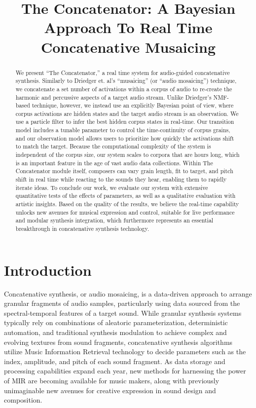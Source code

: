 \documentclass{article}
\title{The Concatenator: A Bayesian Approach To Real Time Concatenative Musaicing}
\begin{document}
%
\maketitle
%

\begin{abstract}
    We present ``The Concatenator,'' a real time system for audio-guided concatenative synthesis. Similarly to Driedger et. al's ``musaicing'' (or ``audio mosaicing'') technique, we concatenate a set number of activations within a corpus of audio to re-create the harmonic and percussive aspects of a target audio stream. Unlike Driedger's NMF-based technique, however, we instead use an explicitly Bayesian point of view, where corpus activations are hidden states and the target audio stream is an observation. We use a particle filter to infer the best hidden corpus states in real-time. Our transition model includes a tunable parameter to control the time-continuity of corpus grains, and our observation model allows users to prioritize how quickly the activations shift to match the target. Because the computational complexity of the system is independent of the corpus size, our system scales to corpora that are hours long, which is an important feature in the age of vast audio data collections. Within The Concatenator module itself, composers can vary grain length, fit to target, and pitch shift in real time while reacting to the sounds they hear, enabling them to rapidly iterate ideas. To conclude our work, we evaluate our system with extensive quantitative tests of the effects of parameters, as well as a qualitative evaluation with artistic insights. Based on the quality of the results, we believe the real-time capability unlocks new avenues for musical expression and control, suitable for live performance and modular synthesis integration, which furthermore represents an essential breakthrough in concatenative synthesis technology.
    
\end{abstract}

\section{Introduction}

Concatenative synthesis, or audio mosaicing, is a data-driven approach to arrange granular fragments of audio samples, particularly using data sourced from the spectral-temporal features of a target sound. While granular synthesis systems typically rely on combinations of aleatoric parameterization, deterministic automation, and traditional synthesis modulation to achieve complex and evolving textures from sound fragments, concatenative synthesis algorithms utilize Music Information Retrieval technology to decide parameters such as the index, amplitude, and pitch of each sound fragment. As data storage and processing capabilities expand each year, new methods for harnessing the power of MIR are becoming available for music makers, along with previously unimaginable new avenues for creative expression in sound design and composition. 
\end{document}
